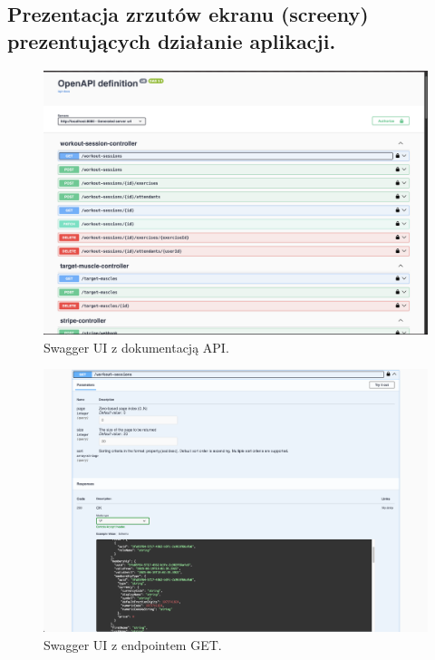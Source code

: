 \documentclass[../../spr.tex]{subfiles}
\begin{document}
\subsection{Prezentacja zrzutów ekranu (screeny) prezentujących działanie aplikacji.}
\begin{figure}[H]
  \centering
  \includegraphics[width=\textwidth]{swagger.png}
  \caption{Swagger UI z dokumentacją API.}
\end{figure}

\begin{figure}
  \centering
  \includegraphics[width=\textwidth]{swaggerget.png}
  \caption{Swagger UI z endpointem GET.}
\end{figure}
\end{document}
